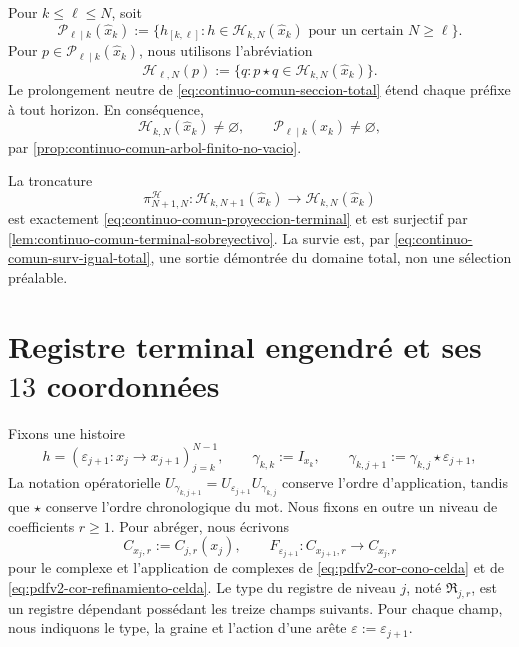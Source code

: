 Pour \(k\leq\ell\leq N\), soit
\begin{equation}
\label{eq:pdfv2-terminal-prefijos-intermedios}
 \mathscr P_{\ell\mid k}(\widehat x_k)
 :=\{h_{[k,\ell]}:h\in\mathscr H_{k,N}(\widehat x_k)
       \text{ pour un certain }N\geq\ell\}.
\end{equation}
Pour \(p\in\mathscr P_{\ell\mid k}(\widehat x_k)\), nous utilisons l'abréviation
\begin{equation}
\label{eq:pdfv2-terminal-continuaciones-prefijo}
 \mathscr H_{\ell,N}(p)
 :=\{q:p\star q\in\mathscr H_{k,N}(\widehat x_k)\}.
\end{equation}
Le prolongement neutre de \eqref{eq:continuo-comun-seccion-total} étend chaque préfixe à tout horizon. En conséquence,
\begin{equation}
\label{eq:pdfv2-terminal-no-vacuidad-historias}
 \mathscr H_{k,N}(\widehat x_k)\neq\varnothing,
 \qquad
 \mathscr P_{\ell\mid k}(\widehat x_k)\neq\varnothing,
\end{equation}
par \cref{prop:continuo-comun-arbol-finito-no-vacio}.

La troncature
\begin{equation}
\label{eq:pdfv2-terminal-truncamiento-historias}
 \pi_{N+1,N}^{\mathscr H}:
 \mathscr H_{k,N+1}(\widehat x_k)
 \longrightarrow\mathscr H_{k,N}(\widehat x_k)
\end{equation}
est exactement \eqref{eq:continuo-comun-proyeccion-terminal} et est surjectif par \cref{lem:continuo-comun-terminal-sobreyectivo}. La survie est, par \eqref{eq:continuo-comun-surv-igual-total}, une sortie démontrée du domaine total, non une sélection préalable.

\section{Registre terminal engendré et ses \(13\) coordonnées}

Fixons une histoire
\[
 h=(\varepsilon_{j+1}:x_j\longrightarrow x_{j+1})_{j=k}^{N-1},
 \qquad
 \gamma_{k,k}:=I_{x_k},\qquad
 \gamma_{k,j+1}:=\gamma_{k,j}\star\varepsilon_{j+1},
\]
La notation opératorielle \(U_{\gamma_{k,j+1}}
=U_{\varepsilon_{j+1}}U_{\gamma_{k,j}}\) conserve l'ordre d'application, tandis que \(\star\) conserve l'ordre chronologique du mot. Nous fixons en outre un niveau de coefficients \(r\geq1\). Pour abréger, nous écrivons
\[
 C_{x_j,r}:=C_{j,r}(x_j),\qquad
 F_{\varepsilon_{j+1}}:C_{x_{j+1},r}\longrightarrow C_{x_j,r}
\]
pour le complexe et l'application de complexes de \eqref{eq:pdfv2-cor-cono-celda} et de \eqref{eq:pdfv2-cor-refinamiento-celda}. Le type du registre de niveau \(j\), noté \(\mathfrak R_{j,r}\), est un registre dépendant possédant les treize champs suivants. Pour chaque champ, nous indiquons le type, la graine et l'action d'une arête \(\varepsilon:=\varepsilon_{j+1}\).

